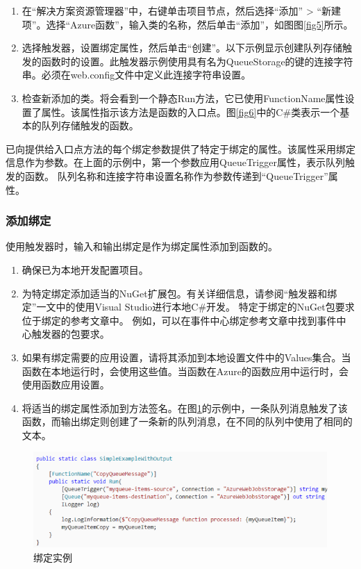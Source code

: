 \documentclass[11pt]{article}
\begin{document}
\begin{enumerate}
	\item 在“解决方案资源管理器”中，右键单击项目节点，然后选择“添加” > “新建项”。选择“Azure函数”，输入类的名称，然后单击“添加”，如图图\ref{fig5}所示。
	\item 选择触发器，设置绑定属性，然后单击“创建”。以下示例显示创建队列存储触发的函数时的设置。此触发器示例使用具有名为QueueStorage的键的连接字符串。必须在web.config文件中定义此连接字符串设置。
	\item 检查新添加的类。将会看到一个静态Run方法，它已使用FunctionName属性设置了属性。该属性指示该方法是函数的入口点。图\ref{fig6}中的C\#类表示一个基本的队列存储触发的函数。	
\end{enumerate}
已向提供给入口点方法的每个绑定参数提供了特定于绑定的属性。该属性采用绑定信息作为参数。在上面的示例中，第一个参数应用QueueTrigger属性，表示队列触发的函数。 队列名称和连接字符串设置名称作为参数传递到“QueueTrigger”属性。

\subsubsection{添加绑定} 
使用触发器时，输入和输出绑定是作为绑定属性添加到函数的。
\begin{enumerate}
	\item 确保已为本地开发配置项目。
	\item 为特定绑定添加适当的NuGet扩展包。有关详细信息，请参阅“触发器和绑定”一文中的使用Visual Studio进行本地C\#开发。 特定于绑定的NuGet包要求位于绑定的参考文章中。 例如，可以在事件中心绑定参考文章中找到事件中心触发器的包要求。
	\item 如果有绑定需要的应用设置，请将其添加到本地设置文件中的Values集合。当函数在本地运行时，会使用这些值。当函数在Azure的函数应用中运行时，会使用函数应用设置。
	\item 将适当的绑定属性添加到方法签名。在图\ref{fig7}的示例中，一条队列消息触发了该函数，而输出绑定则创建了一条新的队列消息，在不同的队列中使用了相同的文本。
\end{enumerate}	
\begin{figure}[!htbp]
	\centering
	\includegraphics[scale=0.6]{figs/7.png}
	\caption{绑定实例}
	\label{fig7}	
\end{figure}
\end{document}
